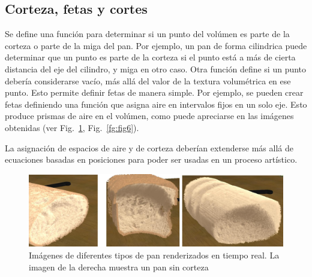 \documentclass[oneside,a4paper,spanish,links]{amca}
\begin{document}
\subsection{Corteza, fetas y cortes}

Se define una función para determinar si un punto del volúmen es parte
de la corteza o parte de la miga del pan. Por ejemplo, un pan de forma
cilindrica puede determinar que un punto es parte de la corteza si el
punto está a más de cierta distancia del eje del cilindro, y miga en
otro caso. Otra función define si un punto debería considerarse vacío,
más allá del valor de la textura volumétrica en ese punto. Esto
permite definir fetas de manera simple. Por ejemplo, se pueden crear
fetas definiendo una función que asigna aire en intervalos fijos en un
solo eje. Esto produce prismas de aire en el volúmen, como puede
apreciarse en las imágenes obtenidas (ver Fig.~\ref{fg:fig5},
Fig.~\ref{fg:fig6}). 


La asignación de espacios de aire y de corteza deberían extenderse más
allá de ecuaciones basadas en posiciones para poder ser usadas en un
proceso artístico.

\begin{figure}[htb!]
  \centerline{\includegraphics[scale=0.3]{fig5}}
  \caption{Imágenes de diferentes tipos de pan renderizados en tiempo
    real. La imagen de la derecha muestra un pan sin corteza}
  \label{fg:fig5}
\end{figure}
\end{document}
